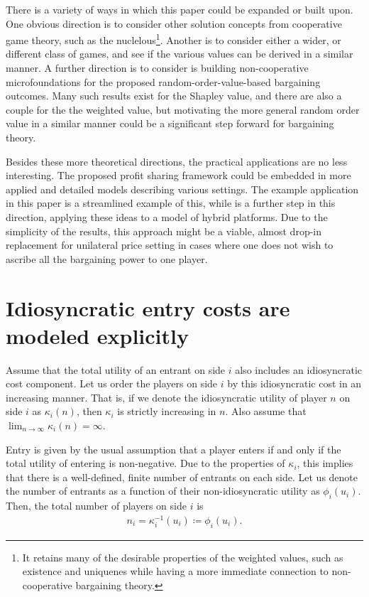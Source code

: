 \documentclass[a4paper]{article}
\begin{document}
There is a variety of ways in which this paper could be expanded or built upon.
One obvious direction is to consider other solution concepts from cooperative game theory, such as the nuclelous\footnote{
    It retains many of the desirable properties of the weighted values, such as existence and uniquenes while having a more immediate connection to non-cooperative bargaining theory.
}.
Another is to consider either a wider, or different class of games, and see if the various values can be derived in a similar manner.
A further direction is to consider is building non-cooperative microfoundations for the proposed random-order-value-based bargaining outcomes.
Many such results exist for the Shapley value, and there are also a couple for the the weighted value, but motivating the more general random order value in a similar manner could be a significant step forward for bargaining theory.

Besides these more theoretical directions, the practical applications are no less interesting.
The proposed profit sharing framework could be embedded in more applied and detailed models describing various settings.
The example application in this paper is a streamlined example of this, while \textcite{stancsics2023hybrid} is a further step in this direction, applying these ideas to a model of hybrid platforms.
Due to the simplicity of the results, this approach might be a viable, almost drop-in replacement for unilateral price setting in cases where one does not wish to ascribe all the bargaining power to one player.


\appendix

\printbibliography

\section{Idiosyncratic entry costs are modeled explicitly}
\label{sec:explicit_entry_costs}

Assume that the total utility of an entrant on side $i$ also includes an idiosyncratic cost component.
Let us order the players on side $i$ by this idiosyncratic cost in an increasing manner.
That is, if we denote the idiosyncratic utility of player $n$ on side $i$ as $\kappa_i(n)$, then $\kappa_i$ is strictly increasing in $n$.
Also assume that $\lim_{n \to \infty} \kappa_i(n) = \infty$.

Entry is given by the usual assumption that a player enters if and only if the total utility of entering is non-negative.
Due to the properties of $\kappa_i$, this implies that there is a well-defined, finite number of entrants on each side.
Let us denote the number of entrants as a function of their non-idiosyncratic utility as $\phi_i(u_i)$.
Then, the total number of players on side $i$ is 
\begin{align*}
    n_i = \kappa_i^{-1}(u_i) \coloneqq \phi_i(u_i).
\end{align*}
\end{document}
